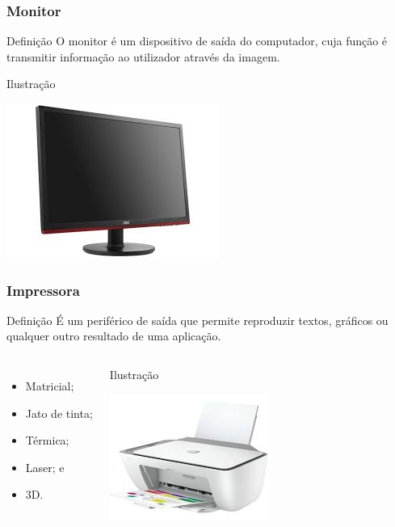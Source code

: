 \documentclass[aspectratio=169]{beamer} %
\begin{document}
\begin{frame}
	\frametitle{Monitor}
	
	\begin{block}{Defini\c cão}
		O monitor é um dispositivo de saída do computador, cuja função é transmitir informação ao utilizador através da imagem.
	\end{block}\vfill
	
	\begin{exampleblock}{Ilustra\c cão}
		\begin{center}
			\includegraphics[scale=0.4]{img/monitor}
		\end{center}		
	\end{exampleblock}
\end{frame}

\begin{frame}
	\frametitle{Impressora}
	
	\begin{block}{Defini\c cão}
		É um periférico de saída que permite reproduzir textos, gráficos ou qualquer outro resultado de uma aplicação.
	\end{block}\vfill	
	
	\begin{columns}
		\begin{itemize}
			\item Matricial;
			\item Jato de tinta;
			\item Térmica;
			\item Laser; e
			\item 3D.
		\end{itemize}

		\begin{exampleblock}{Ilustra\c cão}
			\begin{center}
				\includegraphics[scale=0.5]{img/impressora}
			\end{center}		
		\end{exampleblock}
	\end{columns}
\end{frame}
\end{document}
